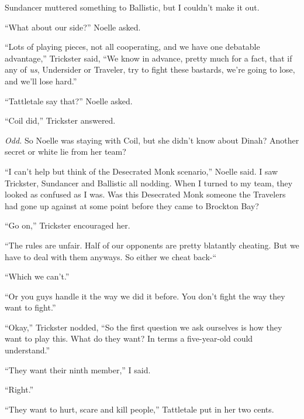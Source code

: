 Sundancer muttered something to Ballistic, but I couldn't make it out.



``What about our side?'' Noelle asked.



``Lots of playing pieces, not all cooperating, and we have one debatable advantage,'' Trickster said, ``We know in advance, pretty much for a fact, that if any of \emph{us}, Undersider or Traveler, try to fight these bastards, we're going to lose, and we'll lose hard.''



``Tattletale say that?'' Noelle asked.



``Coil did,'' Trickster answered.



\emph{Odd.}  So Noelle was staying with Coil, but she didn't know about Dinah?  Another secret or white lie from her team?



``I can't help but think of the Desecrated Monk scenario,'' Noelle said.  I saw Trickster, Sundancer and Ballistic all nodding.  When I turned to my team, they looked as confused as I was.  Was this Desecrated Monk someone the Travelers had gone up against at some point before they came to Brockton Bay?



``Go on,'' Trickster encouraged her.



``The rules are unfair.  Half of our opponents are pretty blatantly cheating.  But we have to deal with them anyways.  So either we cheat back-``



``Which we can't.''



``Or you guys handle it the way we did it before.  You don't fight the way they want to fight.''



``Okay,'' Trickster nodded, ``So the first question we ask ourselves is how they want to play this.  What do they want?  In terms a five-year-old could understand.''



``They want their ninth member,'' I said.



``Right.''



``They want to hurt, scare and kill people,'' Tattletale put in her two cents.



